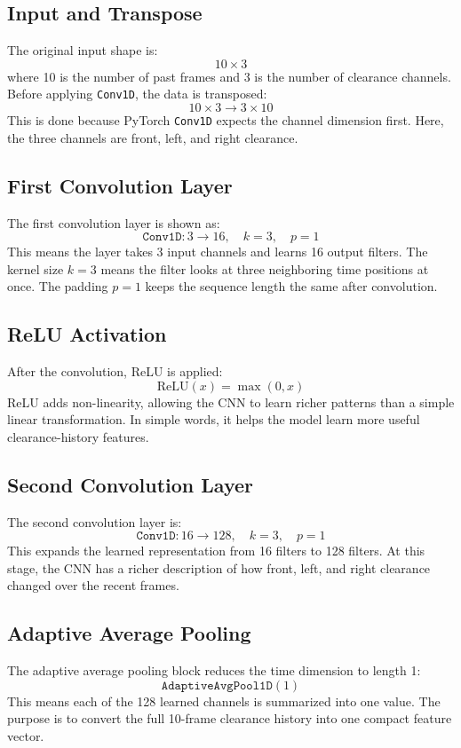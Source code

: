 \documentclass[11pt,a4paper]{article}
\begin{document}
\subsection*{Input and Transpose}
The original input shape is:
\[
    10 \times 3
\]
where 10 is the number of past frames and 3 is the number of clearance channels.
Before applying \texttt{Conv1D}, the data is transposed:
\[
    10 \times 3 \rightarrow 3 \times 10
\]
This is done because PyTorch \texttt{Conv1D} expects the channel dimension first.
Here, the three channels are front, left, and right clearance.

\subsection*{First Convolution Layer}
The first convolution layer is shown as:
\[
    \texttt{Conv1D}: 3 \rightarrow 16,\quad k=3,\quad p=1
\]
This means the layer takes 3 input channels and learns 16 output filters.
The kernel size \(k=3\) means the filter looks at three neighboring time
positions at once. The padding \(p=1\) keeps the sequence length the same after
convolution.

\subsection*{ReLU Activation}
After the convolution, ReLU is applied:
\[
    \text{ReLU}(x) = \max(0,x)
\]
ReLU adds non-linearity, allowing the CNN to learn richer patterns than a simple
linear transformation. In simple words, it helps the model learn more useful
clearance-history features.

\subsection*{Second Convolution Layer}
The second convolution layer is:
\[
    \texttt{Conv1D}: 16 \rightarrow 128,\quad k=3,\quad p=1
\]
This expands the learned representation from 16 filters to 128 filters. At this
stage, the CNN has a richer description of how front, left, and right clearance
changed over the recent frames.

\subsection*{Adaptive Average Pooling}
The adaptive average pooling block reduces the time dimension to length 1:
\[
    \texttt{AdaptiveAvgPool1D}(1)
\]
This means each of the 128 learned channels is summarized into one value. The
purpose is to convert the full 10-frame clearance history into one compact
feature vector.
\end{document}
